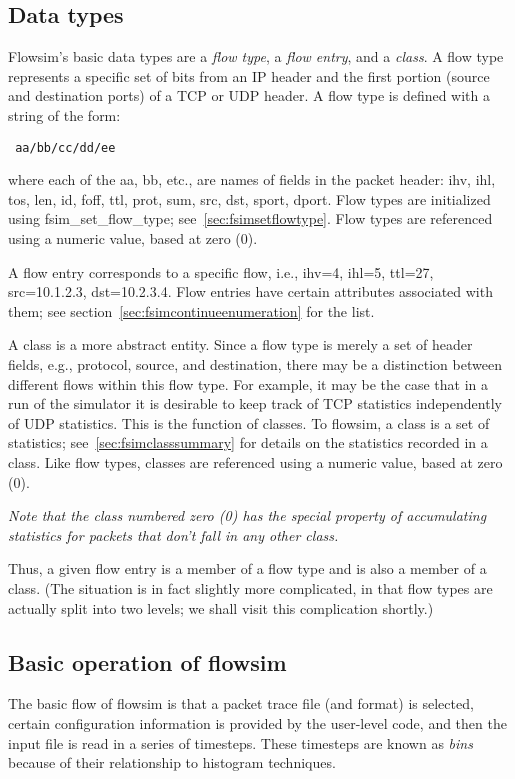 \documentclass{article}
\begin{document}
\subsection{Data types}
Flowsim's basic data types are a \emph{flow type}, a \emph{flow entry},
and a \emph{class}.  A flow type represents a specific set of bits from
an IP header and the first portion (source and destination ports) of a
TCP or UDP header.  A flow type is defined with a string of the form:
\begin{verbatim} aa/bb/cc/dd/ee \end{verbatim}
where each of the aa, bb, etc., are names of fields in the packet
header: ihv, ihl, tos, len, id, foff, ttl, prot, sum, src, dst, sport,
dport.  Flow types are initialized using fsim\_set\_flow\_type;
see~\ref{sec:fsimsetflowtype}.  Flow types are referenced using a
numeric value, based at zero (0).

A flow entry corresponds to a specific flow, i.e., ihv=4, ihl=5,
ttl=27, src=10.1.2.3, dst=10.2.3.4.  Flow entries have certain
attributes associated with them; see
section~\ref{sec:fsimcontinueenumeration} for the list.

A class is a more abstract entity.  Since a flow type is merely a set
of header fields, e.g., protocol, source, and destination, there may be a
distinction between different flows within this flow type.  For
example, it may be the case that in a run of the simulator it is
desirable to keep track of TCP statistics independently of UDP
statistics.  This is the function of classes.  To flowsim, a class is a
set of statistics; see~\ref{sec:fsimclasssummary} for details on the
statistics recorded in a class.  Like flow types, classes are
referenced using a numeric value, based at zero (0).

\emph{Note that the class numbered zero (0) has the special property of
accumulating statistics for packets that don't fall in any other
class.}

Thus, a given flow entry is a member of a flow type and is also a
member of a class.  (The situation is in fact slightly more
complicated, in that flow types are actually split into two levels; we
shall visit this complication shortly.)

\subsection{Basic operation of flowsim}

The basic flow of flowsim is that a packet trace file (and format) is
selected, certain configuration information is provided by the
user-level code, and
then the input file is read in a series of timesteps.  These
timesteps are known as \emph{bins} because of their relationship to
histogram techniques.
\end{document}
